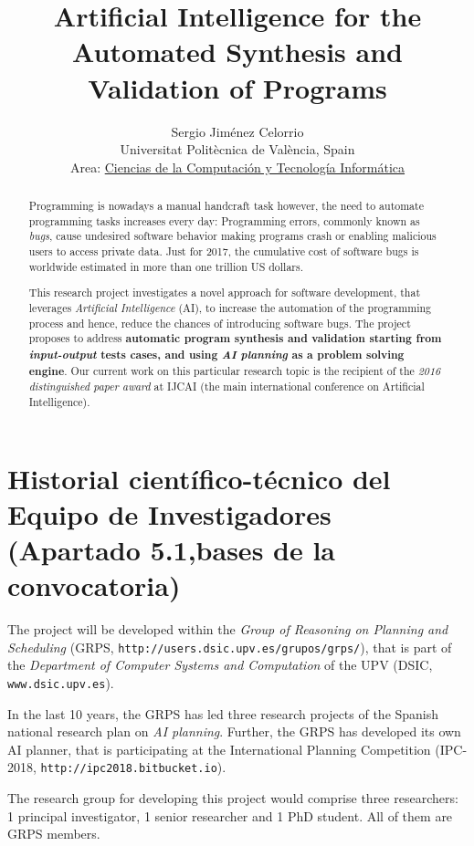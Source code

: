 \documentclass[10pt,a4paper]{paper}
\title{Artificial Intelligence for the Automated Synthesis and Validation of Programs}
\author{Sergio Jim\'enez Celorrio\\
\footnotesize Universitat Politècnica de València, Spain\\
\small Area: \underline{Ciencias de la Computación y Tecnología Informática}}
\begin{document}
\maketitle

\begin{abstract}
  Programming is nowadays a manual handcraft task however, the need to automate programming tasks increases every day: Programming errors, commonly known as {\em bugs}, cause undesired software behavior making programs crash or enabling malicious users to access private data. Just for 2017, the cumulative cost of software bugs is worldwide estimated in more than one trillion US dollars. 

  This research project investigates a novel approach for software development, that leverages {\em Artificial Intelligence} (AI), to increase the automation of the programming process and hence, reduce the chances of introducing software bugs. The project proposes to address {\bf automatic program synthesis and validation starting from {\em input-output} tests cases, and using {\em AI planning} as a problem solving engine}. Our current work on this particular research topic is the recipient of the {\em 2016 distinguished paper award} at {\sc IJCAI} (the main international conference on Artificial Intelligence).
\end{abstract}

\newpage

\section{Historial científico-técnico del Equipo de Investigadores (Apartado 5.1,bases de la convocatoria)}

The project will be developed within the {\em Group of Reasoning on Planning and Scheduling} (GRPS, {\tt http://users.dsic.upv.es/grupos/grps/}), that is part of the {\em Department of Computer Systems and Computation} of the UPV (DSIC, {\tt www.dsic.upv.es}).

In the last 10 years, the GRPS has led three research projects of the Spanish national research plan on {\em AI planning}. Further, the GRPS has developed its own AI planner, that is participating  at the International Planning Competition (IPC-2018, {\tt http://ipc2018.bitbucket.io}).

The research group for developing this project would comprise three researchers: 1 principal investigator, 1 senior researcher and 1 PhD student. All of them are GRPS members. 
\end{document}
